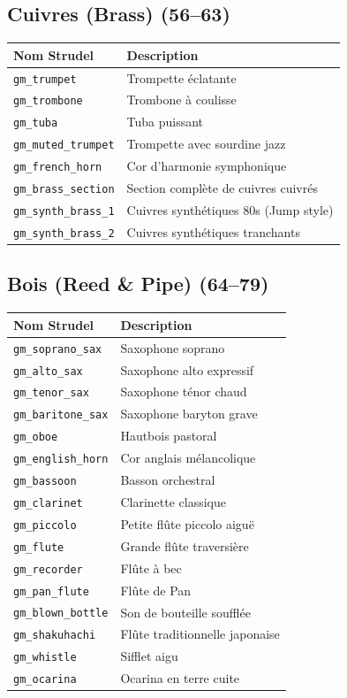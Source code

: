 \documentclass[a4paper,10pt]{article}
\begin{document}
\subsection{Cuivres (Brass) (56--63)}
\begin{tabularx}{\linewidth}{|l|X|}
\hline
\textbf{Nom Strudel} & \textbf{Description} \\
\hline
\texttt{gm\_trumpet} & Trompette éclatante \\
\texttt{gm\_trombone} & Trombone à coulisse \\
\texttt{gm\_tuba} & Tuba puissant \\
\texttt{gm\_muted\_trumpet} & Trompette avec sourdine jazz \\
\texttt{gm\_french\_horn} & Cor d'harmonie symphonique \\
\texttt{gm\_brass\_section} & Section complète de cuivres cuivrés \\
\texttt{gm\_synth\_brass\_1} & Cuivres synthétiques 80s (Jump style) \\
\texttt{gm\_synth\_brass\_2} & Cuivres synthétiques tranchants \\
\hline
\end{tabularx}

\subsection{Bois (Reed \& Pipe) (64--79)}
\begin{tabularx}{\linewidth}{|l|X|}
\hline
\textbf{Nom Strudel} & \textbf{Description} \\
\hline
\texttt{gm\_soprano\_sax} & Saxophone soprano \\
\texttt{gm\_alto\_sax} & Saxophone alto expressif \\
\texttt{gm\_tenor\_sax} & Saxophone ténor chaud \\
\texttt{gm\_baritone\_sax} & Saxophone baryton grave \\
\texttt{gm\_oboe} & Hautbois pastoral \\
\texttt{gm\_english\_horn} & Cor anglais mélancolique \\
\texttt{gm\_bassoon} & Basson orchestral \\
\texttt{gm\_clarinet} & Clarinette classique \\
\texttt{gm\_piccolo} & Petite flûte piccolo aiguë \\
\texttt{gm\_flute} & Grande flûte traversière \\
\texttt{gm\_recorder} & Flûte à bec \\
\texttt{gm\_pan\_flute} & Flûte de Pan \\
\texttt{gm\_blown\_bottle} & Son de bouteille soufflée \\
\texttt{gm\_shakuhachi} & Flûte traditionnelle japonaise \\
\texttt{gm\_whistle} & Sifflet aigu \\
\texttt{gm\_ocarina} & Ocarina en terre cuite \\
\hline
\end{tabularx}
\end{document}
